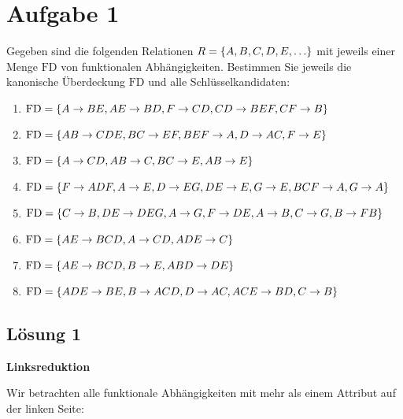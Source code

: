 \documentclass[main.tex]{subfiles}
\begin{document}
\section{Aufgabe 1}
Gegeben sind die folgenden Relationen $R=\set{A,B,C,D,E,\dots}$ mit jeweils einer Menge $\text{FD}$ von funktionalen Abhängigkeiten.
Bestimmen Sie jeweils die kanonische Überdeckung $\text{FD}$ und alle Schlüsselkandidaten:
\begin{enumerate}
\item $\text{FD}=\{A\to BE, AE\to BD, F\to CD, CD\to BEF, CF\to B\}$
\item $\text{FD}=\{AB\to CDE, BC\to EF, BEF\to A, D\to AC, F\to E\}$
\item $\text{FD}=\{A\to CD, AB\to C, BC\to E, AB\to E\}$
\item $\text{FD}=\{F\to ADF, A\to E, D\to EG, DE\to E, G\to E, BCF\to A, G\to A\}$
\item $\text{FD}=\{C\to B, DE\to DEG, A\to G, F\to DE, A\to B, C\to G, B\to FB\}$
\item $\text{FD}=\{AE\to BCD, A\to CD, ADE\to C\}$
\item $\text{FD}=\{AE\to BCD, B\to E, ABD\to DE\}$
\item $\text{FD}=\{ADE\to BE, B\to ACD, D\to AC, ACE\to BD, C\to B\}$
\end{enumerate}

\subsection{Lösung 1}


\textbf{Linksreduktion}

Wir betrachten alle funktionale Abhängigkeiten mit mehr als einem Attribut auf der linken Seite: \\
\end{document}
